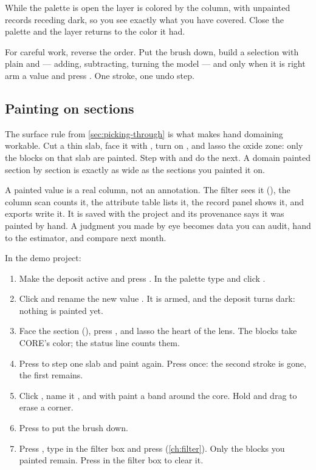 While the palette is open the layer is colored by the column, with unpainted records receding dark, so you see exactly what you have covered. Close the palette and the layer returns to the color it had.

For careful work, reverse the order. Put the brush down, build a selection with plain  and  — adding, subtracting, turning the model — and only when it is right arm a value and press . One stroke, one undo step.

\subsection{Painting on sections}
The surface rule from \cref{sec:picking-through} is what makes hand domaining workable. Cut a thin slab, face it with , turn on , and lasso the oxide zone: only the blocks on that slab are painted. Step with  and do the next. A domain painted section by section is exactly as wide as the sections you painted it on.

\begin{why}
A painted value is a real column, not an annotation. The filter sees it (), the column scan counts it, the attribute table lists it, the record panel shows it, and exports write it. It is saved with the project and its provenance says it was painted by hand. A judgment you made by eye becomes data you can audit, hand to the estimator, and compare next month.
\end{why}

\begin{tryit}
In the demo project:
\begin{enumerate}
\item Make the deposit active and press . In the palette type  and click .
\item Click  and rename the new value . It is armed, and the deposit turns dark: nothing is painted yet.
\item Face the section (), press , and lasso the heart of the lens. The blocks take CORE's color; the status line counts them.
\item Press  to step one slab and paint again. Press  once: the second stroke is gone, the first remains.
\item Click , name it , and with  paint a band around the core. Hold  and drag to erase a corner.
\item Press  to put the brush down.
\item Press \key{/}, type  in the filter box and press  (\cref{ch:filter}). Only the blocks you painted remain. Press  in the filter box to clear it.
\end{enumerate}
\end{tryit}

